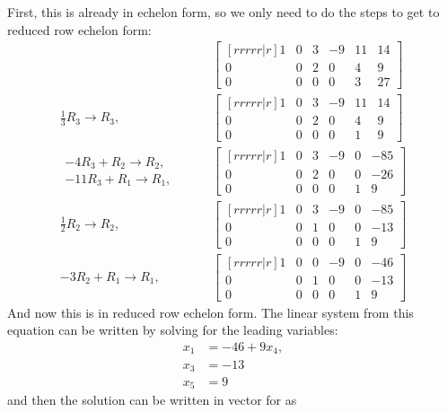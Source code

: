 \begin{example}
First, this is already in echelon form, so we only need to do the steps to get to reduced row echelon form:
\begin{align*}
& \qquad 
\begin{bmatrix}[rrrrr|r]
1 & 0 & 3 & -9 & 11 & 14 \\
0 & 0 & 2 & 0 & 4 & 9 \\
0 & 0 & 0 & 0 & 3 & 27 
\end{bmatrix} \\
\frac{1}{3} R_3 \rightarrow R_3, & \qquad 
\begin{bmatrix}[rrrrr|r]
1 & 0 & 3 & -9 & 11 & 14 \\
0 & 0 & 2 & 0 & 4 & 9 \\
0 & 0 & 0 & 0 & 1 & 9 
\end{bmatrix} \\
\begin{array}{r}
-4 R_3 + R_2 \rightarrow R_2, \\
-11R_3 + R_1 \rightarrow R_1, 
\end{array} & \qquad
\begin{bmatrix}[rrrrr|r]
1 & 0 & 3 & -9 & 0 & -85 \\
0 & 0 & 2 & 0 & 0 & -26 \\
0 & 0 & 0 & 0 & 1 & 9 
\end{bmatrix} \\
\frac{1}{2} R_2 \rightarrow R_2, & \qquad
\begin{bmatrix}[rrrrr|r]
1 & 0 & 3 & -9 & 0 & -85 \\
0 & 0 & 1 & 0 & 0 & -13 \\
0 & 0 & 0 & 0 & 1 & 9 
\end{bmatrix} \\
-3R_2 + R_1 \rightarrow R_1, & \qquad
\begin{bmatrix}[rrrrr|r]
1 & 0 & 0 & -9 & 0 & -46 \\
0 & 0 & 1 & 0 & 0 & -13 \\
0 & 0 & 0 & 0 & 1 & 9 
\end{bmatrix}
\end{align*}
And now this is in reduced row echelon form.  The linear system from this equation can be written by solving for the leading variables:
%
\begin{align*}
x_1 & = -46 + 9x_4, \\
x_3 & = -13 \\
x_5 & = 9 
\end{align*}
and then the solution can be written in vector for as 
%
\begin{align*}

\end{align*}
\end{example}
